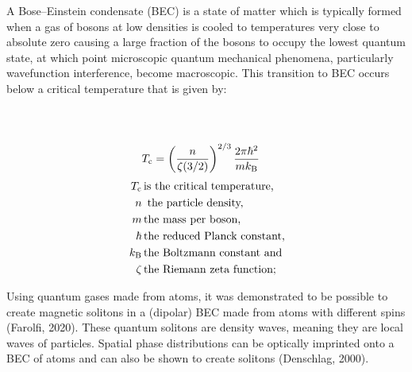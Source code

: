 \documentclass{article}
\begin{document}
    A Bose–Einstein condensate (BEC) is a state of matter which is typically formed when a gas of bosons at low densities is cooled to temperatures very close to absolute zero causing a large fraction of the bosons to occupy the lowest quantum state, at which point microscopic quantum mechanical phenomena, particularly wavefunction interference, become macroscopic. This transition to BEC occurs below a critical temperature that is given by:
    \begin{multicols}{2}
    \noindent
    \begin{align*}
        \\
        \\
        \displaystyle T_{\rm {c}} &=\left({\frac {n}{\zeta (3/2)}}\right)^{2/3}{\frac {2\pi \hbar ^{2}}{mk_{\rm {B}}}} 
    \end{align*}
    \begin{align*}
        {\displaystyle \,T_{\rm {c}}} \,  &\text{is the critical temperature,}\\
        \displaystyle \,n \, 	 &\text{ the particle density,}\\
        {\displaystyle \,m}	\, &\text{the mass per boson,}\\
        {\displaystyle \hbar } \, 	&\text{the reduced Planck constant,}\\
        {\displaystyle \,k_{\rm {B}}}\, 	&\text{the Boltzmann constant and}\\
        {\displaystyle \,\zeta }\, 	&\text{the Riemann zeta function;}
    \end{align*}
    \end{multicols}
    Using quantum gases made from atoms, it was demonstrated to be possible to create magnetic solitons in a (dipolar) BEC made from atoms with different spins (Farolfi, 2020). These quantum solitons are density waves, meaning they are local waves of particles. Spatial phase distributions can be optically imprinted onto a BEC of atoms and can also be shown to create solitons (Denschlag, 2000). 
    
    
    
    
\end{document}
